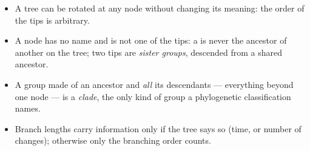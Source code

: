 \begin{proposition}\label{prop:g12:phylogenetic-trees:rules}
\begin{itemize}
  \item A tree can be rotated at any node without changing its
        meaning: the order of the tips is arbitrary.
  \item A node has no name and is not one of the tips: a  is
        never the ancestor of another  on the tree; two tips
        are \emph{sister groups}, descended from a shared ancestor.
  \item A group made of an ancestor and \emph{all} its descendants ---
        everything beyond one node --- is a \emph{clade},
        the only kind of group a phylogenetic classification names.
  \item Branch lengths carry information only if the tree says so
        (time, or number of changes); otherwise only the branching
        order counts.
\end{itemize}
\end{proposition}
\admitted

